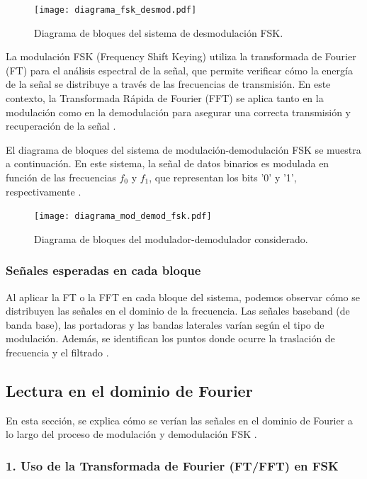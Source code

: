 \documentclass[letter,12pt]{article}
\begin{document}
\begin{figure}[H]
  \centering
  \texttt{[image: diagrama\_fsk\_desmod.pdf]}
  \caption{Diagrama de bloques del sistema de desmodulación FSK.}
  \label{fig:bloques-desmod-fsk}
\end{figure}

La modulación FSK (Frequency Shift Keying) utiliza la transformada de Fourier (FT) para el análisis espectral de la señal, que permite verificar cómo la energía de la señal se distribuye a través de las frecuencias de transmisión. En este contexto, la Transformada Rápida de Fourier (FFT) se aplica tanto en la modulación como en la demodulación para asegurar una correcta transmisión y recuperación de la señal \cite{McCune2010}.

El diagrama de bloques del sistema de modulación-demodulación FSK se muestra a continuación. En este sistema, la señal de datos binarios es modulada en función de las frecuencias \( f_0 \) y \( f_1 \), que representan los bits '0' y '1', respectivamente \cite{McCune2010}.

\begin{figure}[H]
  \centering
  \texttt{[image: diagrama\_mod\_demod\_fsk.pdf]} %
  \caption{Diagrama de bloques del modulador-demodulador considerado.}
  \label{fig:bloques-mod-demod}
\end{figure}

\subsubsection{Señales esperadas en cada bloque}
Al aplicar la FT o la FFT en cada bloque del sistema, podemos observar cómo se distribuyen las señales en el dominio de la frecuencia. Las señales baseband (de banda base), las portadoras y las bandas laterales varían según el tipo de modulación. Además, se identifican los puntos donde ocurre la traslación de frecuencia y el filtrado \cite{McCune2010}.

\subsection{Lectura en el dominio de Fourier}

En esta sección, se explica cómo se verían las señales en el dominio de Fourier a lo largo del proceso de modulación y demodulación FSK \cite{McCune2010}.

\subsubsection{1. Uso de la Transformada de Fourier (FT/FFT) en FSK}
\end{document}
